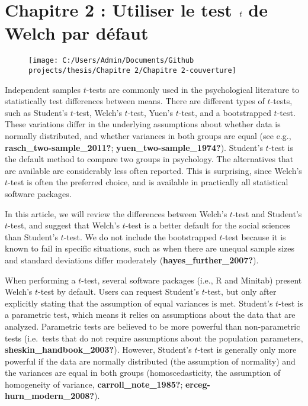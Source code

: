 \documentclass[
  english,
  man]{apa6}
\author{\phantom{0}}
\date{}
\affiliation{\phantom{0}}
\begin{document}
\hypertarget{chapitre-2-utiliser-le-test-bf-emph-t-de-welch-par-duxe9faut}{%
\section{\texorpdfstring{Chapitre 2 : Utiliser le test \(\bf \emph t\) de Welch par défaut}{Chapitre 2 : Utiliser le test \textbackslash bf \textbackslash emph t de Welch par défaut}}\label{chapitre-2-utiliser-le-test-bf-emph-t-de-welch-par-duxe9faut}}

\begin{figure}

{\centering \texttt{[image: C:/Users/Admin/Documents/Github projects/thesis/Chapitre 2/Chapitre 2-couverture]} 

}

\caption{ }\label{fig:chp2p1}
\end{figure}

Independent samples \(t\)-tests are commonly used in the psychological literature to statistically test differences between means. There are different types of \(t\)-tests, such as Student's \(t\)-test, Welch's \(t\)-test, Yuen's \(t\)-test, and a bootstrapped \(t\)-test. These variations differ in the underlying assumptions about whether data is normally distributed, and whether variances in both groups are equal (see e.g., \textbf{rasch\_two-sample\_2011?}; \textbf{yuen\_two-sample\_1974?}). Student's \(t\)-test is the default method to compare two groups in psychology. The alternatives that are available are considerably less often reported. This is surprising, since Welch's \(t\)-test is often the preferred choice, and is available in practically all statistical software packages.

In this article, we will review the differences between Welch's \(t\)-test and Student's \(t\)-test, and suggest that Welch's \(t\)-test is a better default for the social sciences than Student's \(t\)-test. We do not include the bootstrapped \(t\)-test because it is known to fail in specific situations, such as when there are unequal sample sizes and standard deviations differ moderately (\textbf{hayes\_further\_2007?}).

When performing a \(t\)-test, several software packages (i.e., R and Minitab) present Welch's \(t\)-test by default. Users can request Student's \(t\)-test, but only after explicitly stating that the assumption of equal variances is met. Student's \(t\)-test is a parametric test, which means it relies on assumptions about the data that are analyzed. Parametric tests are believed to be more powerful than non-parametric tests (i.e.~tests that do not require assumptions about the population parameters, \textbf{sheskin\_handbook\_2003?}). However, Student's \(t\)-test is generally only more powerful if the data are normally distributed (the assumption of normality) and the variances are equal in both groups (homoscedasticity, the assumption of homogeneity of variance, \textbf{carroll\_note\_1985?}; \textbf{erceg-hurn\_modern\_2008?}).
\end{document}
